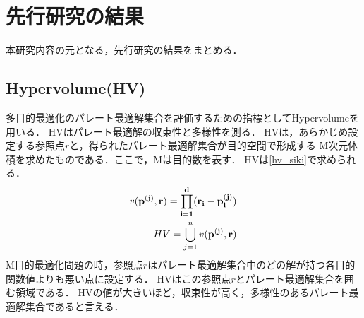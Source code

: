\documentclass[main]{subfiles}
\begin{document}
    \chapter{先行研究の結果}
    本研究内容の元となる，先行研究の結果をまとめる\cite{senkoukenkyu}．

    \section{Hypervolume(HV)}
    多目的最適化のパレート最適解集合を評価するための指標としてHypervolumeを用いる\cite{hv}．
    HVはパレート最適解の収束性と多様性を測る．
    HVは，あらかじめ設定する参照点\boldmath$r$と，得られたパレート最適解集合が目的空間で形成する
    M次元体積を求めたものである．ここで，Mは目的数を表す．
    HVは\ref{hv_siki}で求められる．
    \begin{align}
        v(\bf{p}^{(j)}, \bf r) = \prod_{i=1}^d (r_i - p_i^{(j)}) \\
        HV = \bigcup_{j=1}^n v(\bf{p}^{(j)}, \bf r)
        \label{hv_siki}
    \end{align}
    M目的最適化問題の時，参照点\boldmath$r$はパレート最適解集合中のどの解が持つ各目的関数値よりも悪い点に設定する．
    HVはこの参照点\boldmath$r$とパレート最適解集合を囲む領域である．
    HVの値が大きいほど，収束性が高く，多様性のあるパレート最適解集合であると言える．
    
\end{document}
